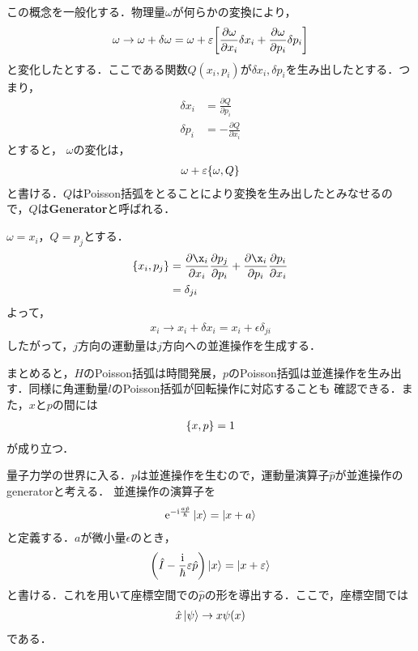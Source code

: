 \documentclass{report}
\begin{document}
  この概念を一般化する．物理量$\omega$が何らかの変換により，
  \begin{align}
    \omega \to \omega + \delta\omega = \omega + \varepsilon\qty[    \frac{\partial\omega}{\partial x_i}\delta x_i + \frac{\partial \omega}{\partial p_i}\delta p_i
    ]
  \end{align}
  と変化したとする．ここである関数$Q(x_i,p_i)$が$\delta x_i,\delta p_i$を生み出したとする．つまり，
  \begin{align}
    \delta x_i &= \frac{\partial Q}{\partial p_i}\\
    \delta p_i &= -\frac{\partial Q}{\partial x_i}
  \end{align}
  とすると，
  $\omega$の変化は，
  \begin{align}
    \omega + \varepsilon\qty{\omega,Q}
  \end{align}
  と書ける．$Q$はPoisson括弧をとることにより変換を生み出したとみなせるので，$Q$は\textbf{Generator}と呼ばれる．
  \begin{myex}{}{}
  $\omega=x_i$，$Q=p_j$とする．
  \begin{align}
    \qty{x_i, p_j} &= \frac{\partial\x_i}{\partial x_i}\frac{\partial p_j}{\partial p_i} + \frac{\partial \x_i}{\partial p_i}\frac{\partial p_i}{\partial x_i}\\
    &= \delta_{ji}
  \end{align}
  よって，
  \begin{align}
    x_i \to x_i + \delta x_i = x_i + \epsilon \delta_{ji}
  \end{align}
  したがって，$j$方向の運動量は$j$方向への並進操作を生成する．
  \end{myex}
  まとめると，$H$のPoisson括弧は時間発展，$p$のPoisson括弧は並進操作を生み出す．同様に角運動量$l$のPoisson括弧が回転操作に対応することも
  確認できる．また，$x$と$p$の間には
  \begin{align}
    \qty{x,p} = 1 \label{xp-poisson}
  \end{align}
  が成り立つ．

  量子力学の世界に入る．$p$は並進操作を生むので，運動量演算子$\hat{p}$が並進操作のgeneratorと考える．
  並進操作の演算子を
  \begin{align}
    \mathrm{e}^{-\mathrm{i}\frac{a\hat{p}}{\hbar}}\ket{x} = \ket{x+a}
  \end{align}
  と定義する．$a$が微小量$\epsilon$のとき，
  \begin{align}
    \qty(\hat{I} - \frac{\mathrm{i}}{\hbar}\varepsilon\hat{p}) \ket{x} = \ket{x+\varepsilon}
  \end{align}
  と書ける．これを用いて座標空間での$\hat{p}$の形を導出する．ここで，座標空間では
  \begin{align}
    \hat{x}\ket{\psi} \to x\psi(x)
  \end{align}
  である．
\end{document}
